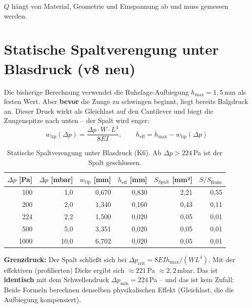 \documentclass[11pt,a4paper]{article}
\begin{document}
$Q$ hängt von Material, Geometrie und Einspannung ab und muss gemessen werden.

\section{Statische Spaltverengung unter Blasdruck (v8 neu)}

Die bisherige Berechnung verwendet die Ruhelage-Aufbiegung $h_\text{max} = 1{,}5$\,mm als festen Wert. Aber \textbf{bevor} die Zunge zu schwingen beginnt, liegt bereits Balgdruck an. Dieser Druck wirkt als Gleichlast auf den Cantilever und biegt die Zungenspitze nach unten -- der Spalt wird enger:
\begin{equation}
w_\text{tip}(\Delta p) = \frac{\Delta p \cdot W \cdot L^4}{8EI}, \qquad h_\text{eff} = h_\text{max} - w_\text{tip}(\Delta p)
\end{equation}

\begin{table}[H]
\centering\small
\begin{tabular}{rrrrrr}
\toprule
$\Delta p$ [Pa] & $\Delta p$ [mbar] & $w_\text{tip}$ [mm] & $h_\text{eff}$ [mm] & $S_\text{Spalt}$ [mm²] & $S/S_\text{Ruhe}$ \\
\midrule
100 & 1{,}0 & 0{,}670 & 0{,}830 & 2{,}21 & 0{,}55 \\
200 & 2{,}0 & 1{,}340 & 0{,}160 & 0{,}43 & 0{,}11 \\
224 & 2{,}2 & 1{,}500 & 0{,}020 & 0{,}05 & 0{,}01 \\
500 & 5{,}0 & 3{,}351 & 0{,}020 & 0{,}05 & 0{,}01 \\
1000 & 10{,}0 & 6{,}702 & 0{,}020 & 0{,}05 & 0{,}01 \\
\bottomrule
\end{tabular}
\caption{Statische Spaltverengung unter Blasdruck (K6). Ab $\Delta p > 224$\,Pa ist der Spalt geschlossen.}
\end{table}

\begin{keybox}
\textbf{Grenzdruck:} Der Spalt schließt sich bei $\Delta p_\text{crit} = 8EIh_\text{max}/(WL^4)$. Mit der effektiven (profilierten) Dicke ergibt sich $\approx 221$\,Pa $\approx 2{,}2$\,mbar. Das ist \textbf{identisch} mit dem Schwellendruck $\Delta p_\text{min} = 224$\,Pa -- und das ist kein Zufall: Beide Formeln berechnen denselben physikalischen Effekt (Gleichlast, die die Aufbiegung kompensiert).
\end{keybox}
\end{document}

